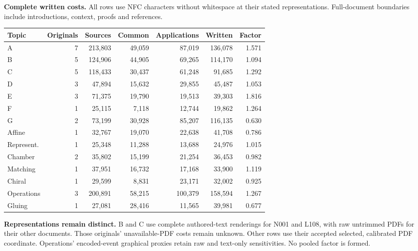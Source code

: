 \documentclass[11pt,a4paper]{article}
\newcommand{\tabsetup}{\small\setlength{\tabcolsep}{4pt}\renewcommand{\arraystretch}{1.10}}
\begin{document}
\textbf{Complete written costs.} All rows use NFC characters without whitespace at their stated representations. Full-document boundaries include introductions, context, proofs and references.
\begin{center}\tabsetup\begin{tabular}{lrrrrrr}\toprule
Topic & Originals & Sources & Common & Applications & Written & Factor\\\midrule
A & 7 & 213,803 & 49,059 & 87,019 & 136,078 & 1.571 \\
B & 5 & 124,906 & 44,905 & 69,265 & 114,170 & 1.094 \\
C & 5 & 118,433 & 30,437 & 61,248 & 91,685 & 1.292 \\
D & 3 & 47,894 & 15,632 & 29,855 & 45,487 & 1.053 \\
E & 3 & 71,375 & 19,790 & 19,513 & 39,303 & 1.816 \\
F & 1 & 25,115 & 7,118 & 12,744 & 19,862 & 1.264 \\
G & 2 & 73,199 & 30,928 & 85,207 & 116,135 & 0.630 \\
Affine & 1 & 32,767 & 19,070 & 22,638 & 41,708 & 0.786 \\
Represent. & 1 & 25,348 & 11,288 & 13,688 & 24,976 & 1.015 \\
Chamber & 2 & 35,802 & 15,199 & 21,254 & 36,453 & 0.982 \\
Matching & 1 & 37,951 & 16,732 & 17,168 & 33,900 & 1.119 \\
Chiral & 1 & 29,599 & 8,831 & 23,171 & 32,002 & 0.925 \\
Operations & 3 & 200,891 & 58,215 & 100,379 & 158,594 & 1.267 \\
Gluing & 1 & 27,081 & 28,416 & 11,565 & 39,981 & 0.677 \\
\bottomrule\end{tabular}\end{center}
\textbf{Representations remain distinct.} B and C use complete authored-text renderings for N001 and L108, with raw untrimmed PDFs for their other documents. Those originals' unavailable-PDF costs remain unknown. Other rows use their accepted selected, calibrated PDF coordinate. Operations' encoded-event graphical proxies retain raw and text-only sensitivities. No pooled factor is formed.
\end{document}
